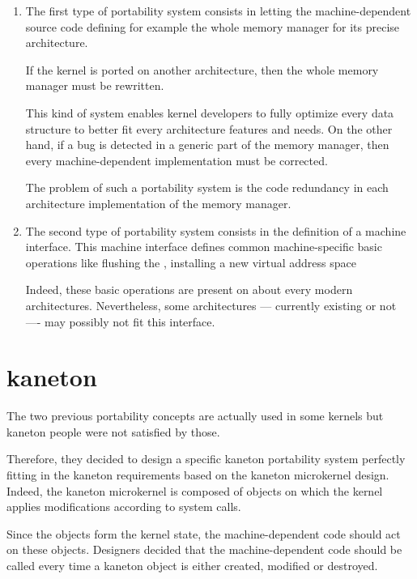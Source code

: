 \begin{enumerate}
  \item
    The first type of portability system consists in letting the
    machine-dependent source code defining for example the whole memory manager
    for its precise architecture.

    \-

    If the kernel is ported on another architecture, then the whole memory
    manager must be rewritten.

    \-

    This kind of system enables kernel developers to fully optimize every
    data structure to better fit every architecture features and needs. On
    the other hand, if a bug is detected in a generic part of the memory
    manager, then every machine-dependent implementation must be corrected.

    \-

    The problem of such a portability system is the code redundancy in each
    architecture implementation of the memory manager.
  \item
    The second type of portability system consists in the definition of
    a machine interface. This machine interface defines common machine-specific
    basic operations like flushing the ,
    installing a new virtual address space \etc{}

    \-

    Indeed, these basic operations are present on about every modern
    architectures. Nevertheless, some architectures --- currently existing or
    not ---- may possibly not fit this interface.
\end{enumerate}

%
%

\section{kaneton}

The two previous portability concepts are actually used in some kernels but
kaneton people were not satisfied by those.

Therefore, they decided to design a specific kaneton portability system
perfectly fitting in the kaneton requirements based on the kaneton microkernel
design. Indeed, the kaneton microkernel is composed of objects on which
the kernel applies modifications according to system calls.

Since the objects form the kernel state, the machine-dependent code should
act on these objects. Designers decided that the machine-dependent code
should be called every time a kaneton object is either created, modified or
destroyed.


